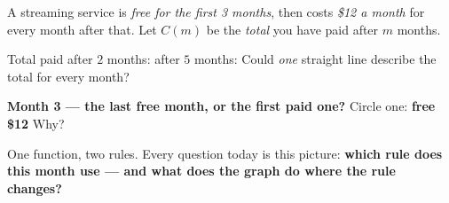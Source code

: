 \boxguard[12]
\begin{hookbox}
\small
A streaming service is \emph{free for the first 3 months}, then costs \emph{\$12 a month} for
every month after that. Let $C(m)$ be the \emph{total} you have paid after $m$ months.
\par\vspace{4pt}
Total paid after $2$ months: \blank{1.2cm} \quad after $5$ months: \blank{1.2cm} \quad
Could \emph{one} straight line describe the total for every month? \blank{1.0cm}
\par\vspace{5pt}
\textbf{Month 3 --- the last free month, or the first paid one?} Circle one: \quad
\textbf{free} \qquad \textbf{\$12} \qquad Why? \blank{5.2cm}
\par\vspace{4pt}
One function, two rules. Every question today is this picture: \textbf{which rule does this
month use --- and what does the graph do where the rule changes?}
\end{hookbox}

